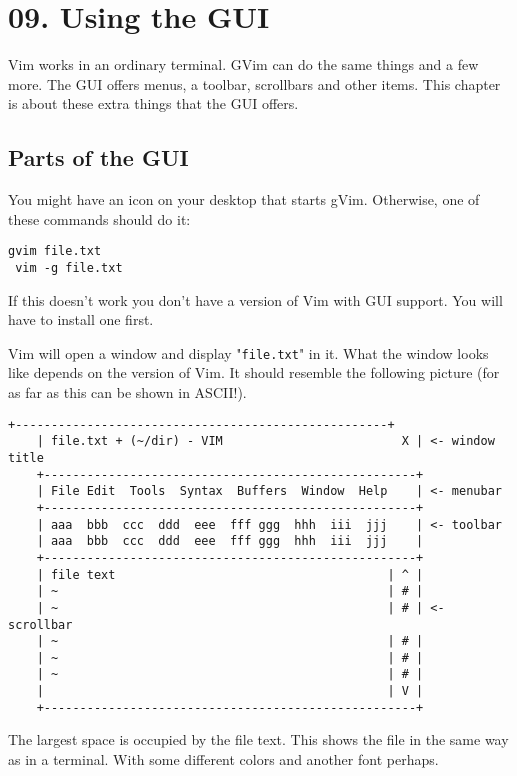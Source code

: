 \section{09. Using the GUI}
Vim works in an ordinary terminal.  GVim can do the same things and a few
more.  The GUI offers menus, a toolbar, scrollbars and other items.  This
chapter is about these extra things that the GUI offers.
\subsection{Parts of the GUI}

You might have an icon on your desktop that starts gVim.
Otherwise, one of these commands should do it:

 \begin{Verbatim}[samepage=true]
 gvim file.txt
 vim -g file.txt
 \end{Verbatim}

If this doesn't work you don't have a version of Vim with GUI support.
You will have to install one first.

Vim will open a window and display "\verb!file.txt!" in it.
What the window looks like depends on the version of Vim.
It should resemble the following picture (for as far as this can be shown in ASCII!).

\begin{Verbatim}[samepage=true]
    +----------------------------------------------------+
    | file.txt + (~/dir) - VIM                         X | <- window title
    +----------------------------------------------------+
    | File Edit  Tools  Syntax  Buffers  Window  Help    | <- menubar
    +----------------------------------------------------+
    | aaa  bbb  ccc  ddd  eee  fff ggg  hhh  iii  jjj    | <- toolbar
    | aaa  bbb  ccc  ddd  eee  fff ggg  hhh  iii  jjj    |
    +----------------------------------------------------+
    | file text                                      | ^ |
    | ~                                              | # |
    | ~                                              | # | <- scrollbar
    | ~                                              | # |
    | ~                                              | # |
    | ~                                              | # |
    |                                                | V |
    +----------------------------------------------------+
\end{Verbatim}

The largest space is occupied by the file text.
This shows the file in the same way as in a terminal.
With some different colors and another font perhaps.
